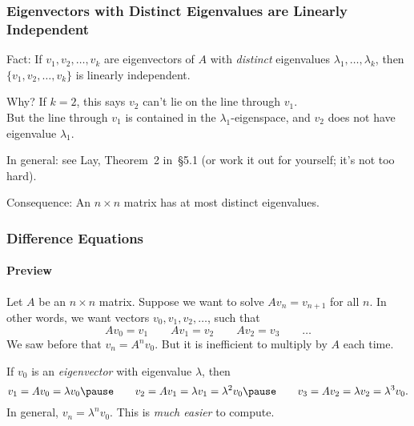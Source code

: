 
\begin{frame}
\frametitle{Eigenvectors with Distinct Eigenvalues are Linearly Independent}

\alert{Fact:} If $v_1,v_2,\ldots,v_k$ are eigenvectors of $A$ with \emph{distinct}
eigenvalues $\lambda_1,\ldots,\lambda_k$, then $\{v_1,v_2,\ldots,v_k\}$ is
linearly independent.

\pause\bigskip
\alert{Why?}
If $k=2$, this says $v_2$ can't lie on the line through $v_1$.\\[1mm]
\pause
But the line through $v_1$ is contained in the $\lambda_1$-eigenspace,
and $v_2$ does not have eigenvalue $\lambda_1$.

\pause\bigskip
\alert{In general:} see Lay, Theorem~2 in~\S5.1 (or work it out for yourself;
it's not too hard).

\pause\bigskip
\alert{Consequence:}
An $n\times n$ matrix has at most  distinct eigenvalues.

\end{frame}



\begin{frame}
\frametitle{Difference Equations}
\framesubtitle{Preview}

Let $A$ be an $n\times n$ matrix.  Suppose we want to solve
$Av_n = v_{n+1}$ for all $n$.
\pause
In other words, we want vectors $v_0,v_1,v_2,\ldots$, such that
\[ Av_0 = v_1 \qquad Av_1 = v_2 \qquad Av_2 = v_3 \qquad \ldots \]
\pause
We saw before that $v_n = A^nv_0$.
\pause
But it is inefficient to multiply by $A$ each time.

\pause\medskip
If $v_0$ is an \emph{eigenvector} with eigenvalue $\lambda$, then
\[ v_1 = Av_0 = \lambda v_0
\pause
\qquad v_2 = Av_1 = \lambda v_1 = \lambda^2v_0
\pause
\qquad v_3 = Av_2 = \lambda v_2 = \lambda^3v_0.
\]
\pause
In general, $v_n = \lambda^n v_0$. 
\pause
This is \emph{much easier} to compute.

\pause\medskip
{}

\end{frame}


